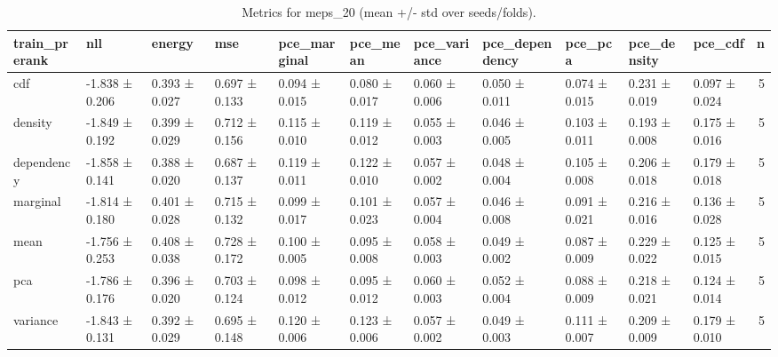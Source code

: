 \begin{table}
\caption{Metrics for meps_20 (mean +/- std over seeds/folds).}
\label{tab:metrics_summary_meps_20}
\begin{tabular}{lllllllllllr}
\toprule
train_prerank & nll & energy & mse & pce_marginal & pce_mean & pce_variance & pce_dependency & pce_pca & pce_density & pce_cdf & n \\
\midrule
cdf & -1.838 ± 0.206 & 0.393 ± 0.027 & 0.697 ± 0.133 & 0.094 ± 0.015 & 0.080 ± 0.017 & 0.060 ± 0.006 & 0.050 ± 0.011 & 0.074 ± 0.015 & 0.231 ± 0.019 & 0.097 ± 0.024 & 5 \\
density & -1.849 ± 0.192 & 0.399 ± 0.029 & 0.712 ± 0.156 & 0.115 ± 0.010 & 0.119 ± 0.012 & 0.055 ± 0.003 & 0.046 ± 0.005 & 0.103 ± 0.011 & 0.193 ± 0.008 & 0.175 ± 0.016 & 5 \\
dependency & -1.858 ± 0.141 & 0.388 ± 0.020 & 0.687 ± 0.137 & 0.119 ± 0.011 & 0.122 ± 0.010 & 0.057 ± 0.002 & 0.048 ± 0.004 & 0.105 ± 0.008 & 0.206 ± 0.018 & 0.179 ± 0.018 & 5 \\
marginal & -1.814 ± 0.180 & 0.401 ± 0.028 & 0.715 ± 0.132 & 0.099 ± 0.017 & 0.101 ± 0.023 & 0.057 ± 0.004 & 0.046 ± 0.008 & 0.091 ± 0.021 & 0.216 ± 0.016 & 0.136 ± 0.028 & 5 \\
mean & -1.756 ± 0.253 & 0.408 ± 0.038 & 0.728 ± 0.172 & 0.100 ± 0.005 & 0.095 ± 0.008 & 0.058 ± 0.003 & 0.049 ± 0.002 & 0.087 ± 0.009 & 0.229 ± 0.022 & 0.125 ± 0.015 & 5 \\
pca & -1.786 ± 0.176 & 0.396 ± 0.020 & 0.703 ± 0.124 & 0.098 ± 0.012 & 0.095 ± 0.012 & 0.060 ± 0.003 & 0.052 ± 0.004 & 0.088 ± 0.009 & 0.218 ± 0.021 & 0.124 ± 0.014 & 5 \\
variance & -1.843 ± 0.131 & 0.392 ± 0.029 & 0.695 ± 0.148 & 0.120 ± 0.006 & 0.123 ± 0.006 & 0.057 ± 0.002 & 0.049 ± 0.003 & 0.111 ± 0.007 & 0.209 ± 0.009 & 0.179 ± 0.010 & 5 \\
\bottomrule
\end{tabular}
\end{table}
